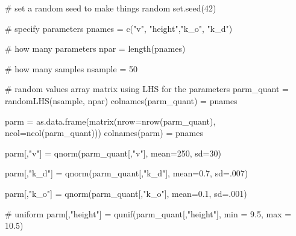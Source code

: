 \documentclass[
  letterpaper,
  DIV=11,
  numbers=noendperiod]{scrartcl}
\newenvironment{Shaded}{\begin{snugshade}}{\end{snugshade}}
\newcommand{\AttributeTok}[1]{\textcolor[rgb]{0.40,0.45,0.13}{#1}}
\newcommand{\CommentTok}[1]{\textcolor[rgb]{0.37,0.37,0.37}{#1}}
\newcommand{\DecValTok}[1]{\textcolor[rgb]{0.68,0.00,0.00}{#1}}
\newcommand{\FloatTok}[1]{\textcolor[rgb]{0.68,0.00,0.00}{#1}}
\newcommand{\FunctionTok}[1]{\textcolor[rgb]{0.28,0.35,0.67}{#1}}
\newcommand{\NormalTok}[1]{\textcolor[rgb]{0.00,0.23,0.31}{#1}}
\newcommand{\OtherTok}[1]{\textcolor[rgb]{0.00,0.23,0.31}{#1}}
\newcommand{\StringTok}[1]{\textcolor[rgb]{0.13,0.47,0.30}{#1}}
\begin{document}
\begin{Shaded}
\begin{Highlighting}[]
\CommentTok{\# set a random seed to make things \textquotesingle{}random\textquotesingle{}}
\FunctionTok{set.seed}\NormalTok{(}\DecValTok{42}\NormalTok{)}

\CommentTok{\# specify parameters}
\NormalTok{pnames }\OtherTok{=} \FunctionTok{c}\NormalTok{(}\StringTok{"v"}\NormalTok{, }\StringTok{"height"}\NormalTok{,}\StringTok{"k\_o"}\NormalTok{, }\StringTok{"k\_d"}\NormalTok{)}

\CommentTok{\# how many parameters}
\NormalTok{npar }\OtherTok{=}  \FunctionTok{length}\NormalTok{(pnames)}
               
\CommentTok{\# how many samples}
\NormalTok{nsample }\OtherTok{=} \DecValTok{50}

\CommentTok{\# random values array matrix using LHS for the parameters}
\NormalTok{parm\_quant }\OtherTok{=} \FunctionTok{randomLHS}\NormalTok{(nsample, npar)}
\FunctionTok{colnames}\NormalTok{(parm\_quant) }\OtherTok{=}\NormalTok{ pnames}


\NormalTok{parm }\OtherTok{=} \FunctionTok{as.data.frame}\NormalTok{(}\FunctionTok{matrix}\NormalTok{(}\AttributeTok{nrow=}\FunctionTok{nrow}\NormalTok{(parm\_quant), }\AttributeTok{ncol=}\FunctionTok{ncol}\NormalTok{(parm\_quant)))}
\FunctionTok{colnames}\NormalTok{(parm) }\OtherTok{=}\NormalTok{ pnames}



\NormalTok{parm[,}\StringTok{"v"}\NormalTok{] }\OtherTok{=} \FunctionTok{qnorm}\NormalTok{(parm\_quant[,}\StringTok{"v"}\NormalTok{], }\AttributeTok{mean=}\DecValTok{250}\NormalTok{, }\AttributeTok{sd=}\DecValTok{30}\NormalTok{)}

\NormalTok{parm[,}\StringTok{"k\_d"}\NormalTok{] }\OtherTok{=} \FunctionTok{qnorm}\NormalTok{(parm\_quant[,}\StringTok{"k\_d"}\NormalTok{], }\AttributeTok{mean=}\FloatTok{0.7}\NormalTok{, }\AttributeTok{sd=}\NormalTok{.}\DecValTok{007}\NormalTok{)}

\NormalTok{parm[,}\StringTok{"k\_o"}\NormalTok{] }\OtherTok{=} \FunctionTok{qnorm}\NormalTok{(parm\_quant[,}\StringTok{"k\_o"}\NormalTok{], }\AttributeTok{mean=}\FloatTok{0.1}\NormalTok{, }\AttributeTok{sd=}\NormalTok{.}\DecValTok{001}\NormalTok{)}

\CommentTok{\# uniform}
\NormalTok{parm[,}\StringTok{"height"}\NormalTok{] }\OtherTok{=} \FunctionTok{qunif}\NormalTok{(parm\_quant[,}\StringTok{"height"}\NormalTok{], }\AttributeTok{min =} \FloatTok{9.5}\NormalTok{, }\AttributeTok{max =} \FloatTok{10.5}\NormalTok{)}
\end{Highlighting}
\end{Shaded}
\end{document}
